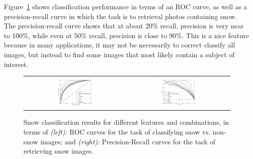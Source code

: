 Figure~\ref{fig:PR_ROC_snow} shows classification performance in
terms of an ROC curve, as well as a
precision-recall curve in which the task is to retrieval photos
containing snow. The precision-recall curve shows that at about 20\%
recall, precision is very near to 100\%, while even at 50\% recall,
precision is close to 90\%.  This is a nice feature because in many
applications, it may not be necessarily to correct classify all
images, but instead to find some images that most likely contain a
subject of interest.
%

\begin{figure}[th!]
\begin{center}
\vspace{-16pt}
\begin{tabular}{cc}
 \includegraphics[width=0.4\textwidth]{figs/ROC-CNN-curves.jpg} &
\includegraphics[width=0.4\textwidth]{figs/PR-CNN-curves.jpg} \\
\end{tabular}
\end{center}
\vspace{-8pt}
\caption{
Snow classification results for different features and combinations, in terms of {\textit{(left):}} ROC curves for the task of classifying snow vs. non-snow images; and 
{\textit{(right):}} Precision-Recall curves for the task of retrieving snow images.
}
\label{fig:PR_ROC_snow}
\end{figure}
%
